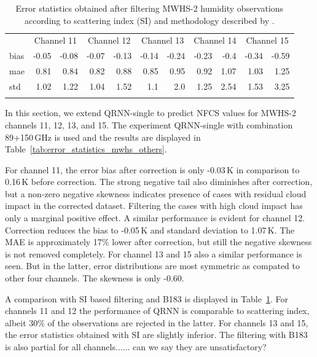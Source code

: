 \documentclass[amt, manuscript]{copernicus}
\newcommand{\todo}[1]{{\color{red} #1}}
\begin{document}
\begin{table}[t]
	\caption{Error statistics obtained after filtering MWHS-2 humidity observations according to scattering index (SI) and methodology described by \citet{buehler:aclou:07}.}
	\label{tab:SI_statistics}
	\begin{tabular}{lrr|rr|rr|rr|rr}
		\tophline
		& \multicolumn{2}{c|}{Channel 11} & \multicolumn{2}{c|}{Channel 12} & \multicolumn{2}{c|}{Channel 13} & \multicolumn{2}{c|}{Channel 14} & \multicolumn{2}{c}{Channel 15}\\
			\cline{2-11}
		bias &-0.05	&-0.08	&-0.07&	-0.13&-0.14	&-0.24	&-0.23&	-0.4&-0.34&	-0.59\\
		mae  & 0.81	&0.84	&0.82 &	0.88 &	0.85&0.95   &0.92 &	1.07&1.03 &	1.25\\
		std  &1.02	&1.22	&1.04 &	1.52 &	1.1	& 2.0	&1.25 &	2.54&1.53&	3.25\\
		\bottomhline		
	\end{tabular}
\end{table}

In this section, we extend QRNN-single to predict NFCS values for MWHS-2 channels 11, 12, 13, and 15. The experiment QRNN-single with combination 89+150\,GHz is used and the results are displayed in Table~\ref{tab:error_statistics_mwhs_others}.

For channel 11, the error bias after correction is only -0.03\,K in comparison to 0.16\,K before correction. The strong negative tail also diminishes after correction, but a non-zero negative skewness indicates presence of cases with residual cloud impact in the corrected dataset. Filtering the cases with high cloud impact has only a marginal positive effect. A similar performance is evident for channel 12. Correction reduces the bias to -0.05\,K and standard deviation to 1.07\,K. The MAE is approximately 17\% lower after correction, but still the negative skewness is not removed completely. For channel 13 and 15 also a similar performance is seen. But in the latter, error distributions are most symmetric as compated to other four channels. The skewness is only -0.60. 

A comparison with SI based filtering and B183 is displayed in  Table~\ref{tab:SI_statistics}. For channels 11 and 12 the performance of QRNN is comparable to scattering index, albeit 30\% of the observations are rejected in the latter. For channels 13 and 15, the error statistics obtained with SI are slightly inferior. The filtering with B183 is also partial for all channels......\todo{can we say they are unsatisfactory?}
\end{document}

